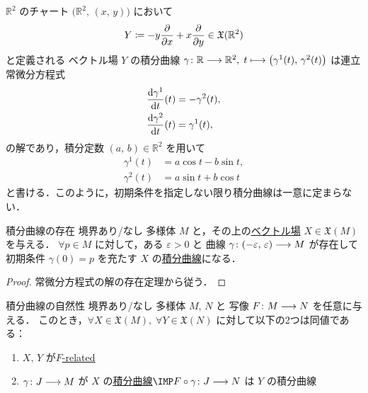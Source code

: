 \documentclass[geometry_main]{subfiles}
\begin{document}
\begin{myexample}[label=ex:integral-curve1]{}
    $\mathbb{R}^2$ のチャート $\bigl(\mathbb{R}^2,\, (x,\, y)\bigr)$ において
    \begin{align}
        Y \coloneqq - y \pdv{}{x} + x \pdv{}{y} \in \mathfrak{X} (\mathbb{R}^2)
    \end{align}
    と定義される \cinfty ベクトル場 $Y$ の積分曲線 $\gamma \colon \mathbb{R} \longrightarrow \mathbb{R}^2,\; t \longmapsto \bigl( \gamma^1(t),\, \gamma^2 (t)\bigr) $ は連立常微分方程式
    \begin{align}
        \dv{\gamma^1}{t}()(t) &= - \gamma^2 (t), \\
        \dv{\gamma^2}{t}()(t) &= \gamma^1 (t),
    \end{align}
    の解であり，積分定数 $(a,\, b) \in \mathbb{R}^2$ を用いて
    \begin{align}
        \gamma^1(t) &= a \cos t - b \sin t, \\
        \gamma^2(t) &= a \sin t + b \cos t
    \end{align}
    と書ける．このように，初期条件を指定しない限り積分曲線は一意に定まらない．
\end{myexample}


\begin{myprop}[label=prop:existence-integral]{積分曲線の存在}
    境界あり/なし \cinfty 多様体 $M$ と，その上の\hyperref[def:vecf]{\cinfty ベクトル場} $X \in \mathfrak{X}(M)$ を与える．
    $\forall p \in M$ に対して，ある $\varepsilon > 0$ と \cinfty 曲線 $\gamma \colon (-\varepsilon,\, \varepsilon) \longrightarrow M$ が存在して
    初期条件 $\gamma(0) = p$ を充たす $X$ の\hyperref[def:integral-curve]{積分曲線}になる．
\end{myprop}

\begin{proof}
    常微分方程式の解の存在定理から従う．
\end{proof}

\begin{myprop}[label=prop:natural-integral-curve]{積分曲線の自然性}
    境界あり/なし \cinfty 多様体 $M,\, N$ と \cinfty 写像 $F \colon M \longrightarrow N$ を任意に与える．
    このとき，$\forall X \in \mathfrak{X}(M),\; \forall Y \in \mathfrak{X}(N)$ に対して以下の2つは同値である：
    \begin{enumerate}
        \item $X,\, Y$ が\hyperref[def:F-related]{$F$-related}
        \item $\gamma \colon J \longrightarrow M$ が $X$ の\hyperref[def:integral-curve]{積分曲線}$\IMP F \circ \gamma \colon J \lto N$ は $Y$ の積分曲線
    \end{enumerate}
\end{myprop}
\end{document}
